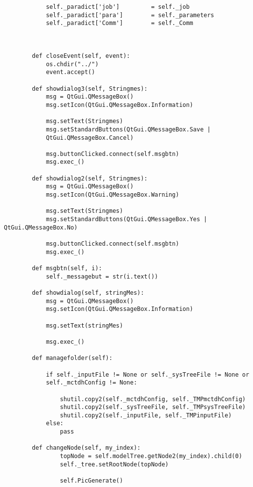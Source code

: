 \begin{verbatim}
            self._paradict['job']         = self._job
            self._paradict['para']        = self._parameters
            self._paradict['Comm']        = self._Comm
    
    
    
        def closeEvent(self, event):
            os.chdir("../")
            event.accept()
    
        def showdialog3(self, Stringmes):
            msg = QtGui.QMessageBox()
            msg.setIcon(QtGui.QMessageBox.Information)
    
            msg.setText(Stringmes)
            msg.setStandardButtons(QtGui.QMessageBox.Save | 
            QtGui.QMessageBox.Cancel)
    
            msg.buttonClicked.connect(self.msgbtn)
            msg.exec_()
    
        def showdialog2(self, Stringmes):
            msg = QtGui.QMessageBox()
            msg.setIcon(QtGui.QMessageBox.Warning)
    
            msg.setText(Stringmes)
            msg.setStandardButtons(QtGui.QMessageBox.Yes | QtGui.QMessageBox.No)
    
            msg.buttonClicked.connect(self.msgbtn)
            msg.exec_()
    
        def msgbtn(self, i):
            self._messagebut = str(i.text())
    
        def showdialog(self, stringMes):
            msg = QtGui.QMessageBox()
            msg.setIcon(QtGui.QMessageBox.Information)
    
            msg.setText(stringMes)
    
            msg.exec_()   
    
        def managefolder(self):
    
            if self._inputFile != None or self._sysTreeFile != None or 
            self._mctdhConfig != None:
    
                shutil.copy2(self._mctdhConfig, self._TMPmctdhConfig)
                shutil.copy2(self._sysTreeFile, self._TMPsysTreeFile)
                shutil.copy2(self._inputFile, self._TMPinputFile)
            else:
                pass
    
        def changeNode(self, my_index):
                topNode = self.modelTree.getNode2(my_index).child(0)
                self._tree.setRootNode(topNode)
                
                self.PicGenerate()
    

\end{verbatim}
